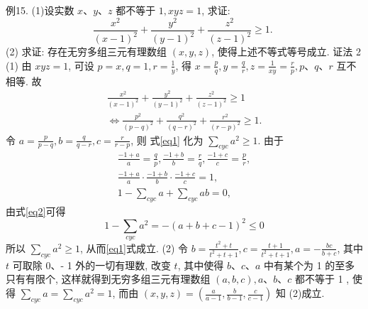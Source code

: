 例15. (1)设实数 $x 、 y 、 z$ 都不等于 $1, x y z=1$, 求证:
$$
\frac{x^2}{(x-1)^2}+\frac{y^2}{(y-1)^2}+\frac{z^2}{(z-1)^2} \geqslant 1 \text {. }
$$
(2) 求证: 存在无穷多组三元有理数组 $(x, y, z)$, 使得上述不等式等号成立.
证法 2 (1) 由 $x y z=1$, 可设 $p=x, q=1, r=\frac{1}{y}$, 得 $x=\frac{p}{q}, y=\frac{q}{r}, z= \frac{1}{x y}=\frac{r}{p}, p 、 q 、 r$ 互不相等.
故
$$
\begin{gathered}
\frac{x^2}{(x-1)^2}+\frac{y^2}{(y-1)^2}+\frac{z^2}{(z-1)^2} \geqslant 1 \\
\Leftrightarrow \frac{p^2}{(p-q)^2}+\frac{q^2}{(q-r)^2}+\frac{r^2}{(r-p)^2} \geqslant 1 .
\end{gathered} \label{eq1}
$$
令 $a=\frac{p}{p-q}, b=\frac{q}{q-r}, c=\frac{r}{r-p}$, 则 式\ref{eq1} 化为 $\sum_{c y c} a^2 \geqslant 1$. 由于
$$
\begin{gathered}
\frac{-1+a}{a}=\frac{q}{p}, \frac{-1+b}{b}=\frac{r}{q}, \frac{-1+c}{c}=\frac{p}{r}, \\
\frac{-1+a}{a} \cdot \frac{-1+b}{b} \cdot \frac{-1+c}{c}=1, \\
1-\sum_{c y c} a+\sum_{c y c} a b=0,
\end{gathered} \label{eq2}
$$
由式\ref{eq2}可得
$$
1-\sum_{c y c} a^2=-(a+b+c-1)^2 \leqslant 0
$$
所以 $\sum_{c y c} a^2 \geqslant 1$, 从而\ref{eq1}式成立.
(2) 令 $b=\frac{t^2+t}{t^2+t+1}, c=\frac{t+1}{t^2+t+1}, a=-\frac{b c}{b+c}$, 其中 $t$ 可取除 0、- 1 外的一切有理数, 改变 $t$, 其中使得 $b 、 c 、 a$ 中有某个为 1 的至多只有有限个, 这样就得到无穷多组三元有理数组 $(a, b, c), a 、 b 、 c$ 都不等于 1 , 使得 $\sum_{c y c} a= \sum_{c y c} a^2=1$, 而由 $(x, y, z)=\left(\frac{a}{a-1}, \frac{b}{b-1}, \frac{c}{c-1}\right)$ 知 (2)成立.


